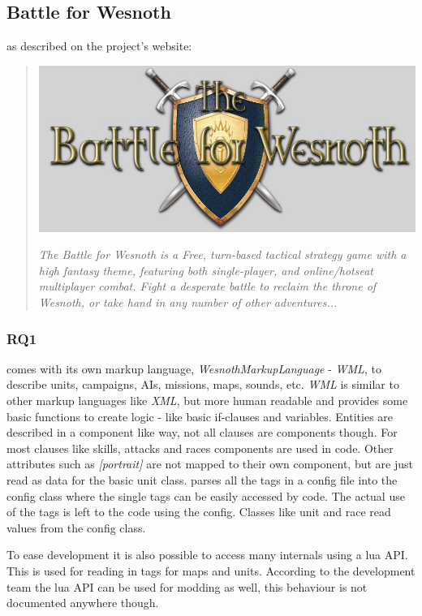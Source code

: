 \subsection{Battle for Wesnoth}
\BOW{} as described on the project's website:
\begin{quote}

\begin{center}\includegraphics[scale=0.4]{pics/wesnothlogo}\end{center}

\textit{The Battle for Wesnoth is a Free, turn-based tactical strategy game with a high fantasy theme, featuring both
single-player, and online/hotseat multiplayer combat. Fight a desperate battle to reclaim the throne of Wesnoth, or take
hand in any number of other adventures... }
\end{quote}

\subsubsection{RQ1}
\BOW{} comes with its own markup language, \textit{WesnothMarkupLanguage} - \textit{WML}, to describe units, campaigns, AIs,
missions, maps, sounds, etc. \textit{WML} is similar to other markup languages like \textit{XML}, but more human readable and provides
some basic functions to create logic - like basic if-clauses and variables. 
Entities are described in a component like way, not all clauses are components though. For most clauses like skills,
attacks and races components are used in code. Other attributes such as \textit{[portrait]} are not mapped to their own
component, but are just read as data for the basic unit class. 
\BOW{} parses all the tags in a config file into the config class where the single tags can be easily accessed by code.
The actual use of the tags is left to the code using the config. Classes like unit and race read values from the config
class.

To ease development it is also possible to access many internals using a lua API. This is used for reading in
tags for maps and units. According to the development team the lua API can be used for modding as well, this behaviour
is not documented anywhere though.

